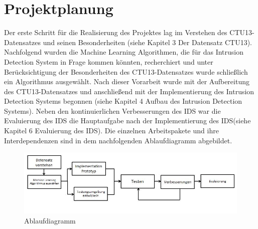 \documentclass[main.tex]{subfiles}
\begin{document}
\section{Projektplanung}

Der erste Schritt für die Realisierung des Projektes lag im Verstehen des CTU13-Datensatzes und seinen Besonderheiten (siehe Kapitel 3 Der Datensatz CTU13). Nachfolgend wurden die Machine Learning Algorithmen, die für das Intrusion Detection System in Frage kommen könnten, recherchiert und unter Berücksichtigung der Besonderheiten des CTU13-Datensatzes wurde schließlich ein Algorithmus ausgewählt. Nach dieser Vorarbeit wurde mit der Aufbereitung des CTU13-Datensatzes und anschließend mit der Implementierung des Intrusion Detection Systems begonnen (siehe Kapitel 4 Aufbau des Intrusion Detection Systems). Neben den kontinuierlichen Verbesserungen des IDS war die Evaluierung des IDS die Hauptaufgabe nach der Implementierung des IDS(siehe Kapitel 6 Evaluierung des IDS). 
Die einzelnen Arbeitspakete und ihre Interdependenzen sind in dem nachfolgenden Ablaufdiagramm abgebildet. 

\begin{figure}[ht]
 \centering
 \includegraphics[width=1\textwidth]{images/Ablaufdiagramm.JPG}
 \caption{Ablaufdiagramm}
 \label{Ablaufdiagramm}
\end{figure}
\end{document}
